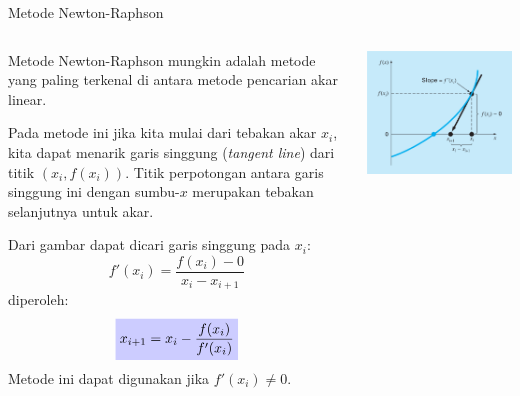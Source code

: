 


\begin{frame}{Metode Newton-Raphson}
\fontsize{9}{10}\selectfont

\begin{columns}

  \begin{column}{0.5\textwidth}
  Metode Newton-Raphson mungkin adalah metode yang paling terkenal
  di antara metode pencarian akar linear.

  Pada metode ini jika kita mulai dari tebakan akar $x_i$, kita dapat menarik garis
  singgung (\textit{tangent line})
  dari titik $(x_i, f(x_i))$. Titik perpotongan antara garis singgung ini
  dengan sumbu-$x$ merupakan tebakan selanjutnya untuk akar.
  
  Dari gambar dapat dicari garis singgung pada $x_i$:
  $$
  f'(x_{i}) = \frac{f(x_i) - 0}{x_i - x_{i+1}}
  $$
  diperoleh:
  \begin{equation}
  \myhighlight{
  x_{i+1} = x_{i} - \frac{f(x_{i})}{f'(x_{i})}
  }\label{eq:Chapra_6_6}
  \end{equation}
  Metode ini dapat digunakan jika $f'(x_{i}) \neq 0$.
  \end{column}

  \begin{column}{0.5\textwidth}
  {\centering
  \includegraphics[height=0.8\textheight]{../chapra_7th/Chapra_Fig_6_5.png}
  \par}
  \end{column}

\end{columns}

\end{frame}



